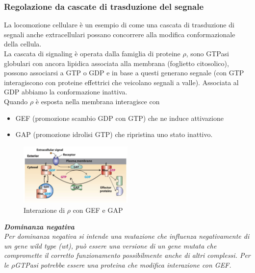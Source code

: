         \subsubsection{Regolazione da cascate di trasduzione del segnale}
            La locomozione cellulare è un esempio di come una cascata di trasduzione di segnali anche extracellulari possano concorrere alla modifica conformazionale della cellula.\\
            La cascata di signaling è operata dalla famiglia di proteine $\rho$, sono GTPasi globulari con ancora lipidica associata alla membrana (foglietto citosolico), possono associarsi a GTP o GDP e in base a questi generano segnale (con GTP interagiscono con proteine effettrici che veicolano segnali a valle). Associata al GDP abbiamo la conformazione inattiva.\\
            Quando $\rho$ è esposta nella membrana interagisce con
            \begin{itemize}
                \item GEF (promozione scambio GDP con GTP) che ne induce attivazione
                \item GAP (promozione idrolisi GTP) che ripristina uno stato inattivo.
            \end{itemize}
            \begin{figure}[h]
                \centering
                \includegraphics[width=0.5\textwidth]{images/RhoGEFeGAP.JPG}
                \caption{\small Interazione di $\rho$ con GEF e GAP}
                \label{fig:mesh1}
            \end{figure}
            
            \textit{
                \textbf{Dominanza negativa}\\
                Per dominanza negativa si intende una mutazione che influenza negativamente di un gene wild type (wt), può essere una versione di un gene mutata che compromette il corretto funzionamento possibilmente anche di altri complessi. Per le $\rho$GTPasi potrebbe essere una proteina che modifica interazione con GEF.\\}
            
